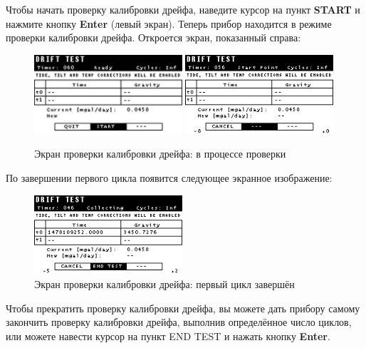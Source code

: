 Чтобы начать проверку калибровки дрейфа, наведите курсор на пункт \textbf{START}
и нажмите кнопку \textbf{Enter} (левый экран). Теперь прибор \cg{} находится в
режиме проверки калибровки дрейфа. Откроется экран, показанный справа:

\begin{figure}[H]
  \centering
  \includegraphics[width=0.49\textwidth]{figures/the_drift_calibration_test_screen_test_in_progress_1}
  \includegraphics[width=0.49\textwidth]{figures/the_drift_calibration_test_screen_test_in_progress_2}
  \caption{Экран проверки калибровки дрейфа: в процессе проверки}
  \label{fig:the_drift_calibration_test_screen_test_in_progress}
\end{figure}

По завершении первого цикла появится следующее экранное изображение:

\begin{figure}[H]
  \centering
  \includegraphics[width=0.49\textwidth]{figures/the_drift_calibration_test_active_screen_first_cycle_completed}
  \caption{Экран проверки калибровки дрейфа: первый цикл завершён}
  \label{fig:the_drift_calibration_test_active_screen_first_cycle_completed}
\end{figure}

Чтобы прекратить проверку калибровки дрейфа, вы можете дать прибору \cg{} самому
закончить проверку калибровки дрейфа, выполнив определённое число циклов, или
можете навести курсор на пункт END TEST и нажать кнопку \textbf{Enter}.


